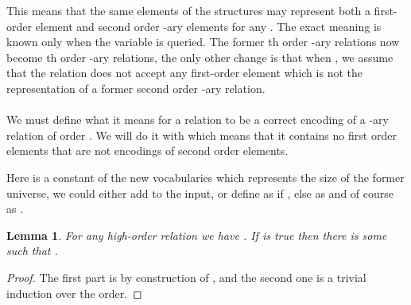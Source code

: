 \documentclass[a4paper,12pt]{article}
\newtheorem{lemma}[theorem]{Lemma}
\theoremstyle{definition}
\begin{document}
This means that the same elements of the structures may represent both
a first-order element and second order -ary elements for any
. The exact meaning is known only when the variable is queried.
The former th order -ary relations now become
th order -ary relations, the only other change is that
when , we assume that the relation does not accept any
first-order element which is not the representation of a former second
order -ary relation.



\paragraph{} We must define what it means for a relation  to
be a correct encoding of a -ary relation of order . We will do
it with  which means that it contains no first
order elements that are not encodings of second order elements.

Here  is a constant of the new vocabularies which represents the size of
the former universe, we could either  add  to the
input, or define  as  if , else as
 and of course  as .

\begin{lemma}\label{lem:lower}
  For any high-order relation  we have
  . If  is true then
  there is some  such that .
\end{lemma}
\begin{proof}
  The first part is by construction of , and the second one is a
  trivial induction over the order.
\end{proof}
\end{document}
